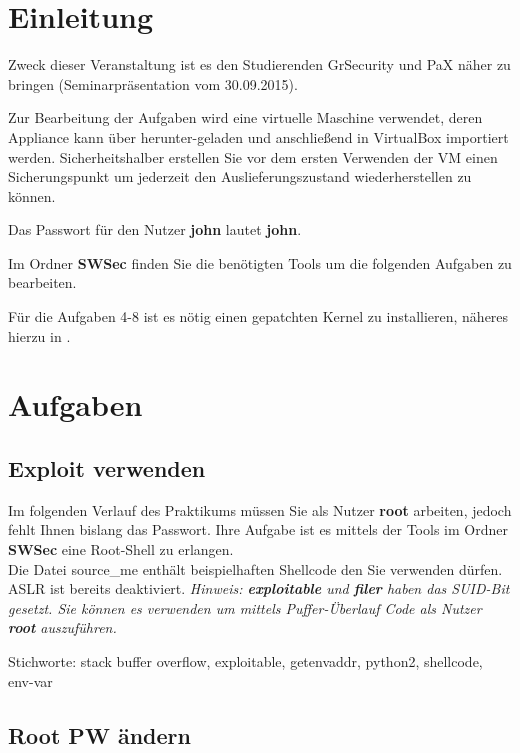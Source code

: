 \section{Einleitung}
\label{sec:Einleitung}
Zweck dieser Veranstaltung ist es den Studierenden GrSecurity und PaX näher zu bringen (Seminarpräsentation vom 30.09.2015).

Zur Bearbeitung der Aufgaben wird eine virtuelle Maschine verwendet, deren Appliance kann über  herunter-geladen und anschließend in VirtualBox importiert werden. Sicherheitshalber erstellen Sie vor dem ersten Verwenden der VM einen Sicherungspunkt um jederzeit den Auslieferungszustand wiederherstellen zu können.

Das Passwort für den Nutzer \textbf{john} lautet \textbf{john}.

Im Ordner \textbf{SWSec} finden Sie die benötigten Tools um die folgenden Aufgaben zu bearbeiten.

Für die Aufgaben 4-8 ist es nötig einen gepatchten Kernel zu installieren, näheres hierzu in .

\section{Aufgaben}
\label{Aufgaben}

\subsection{Exploit verwenden}
\label{subsec:Exploit verwenden}

Im folgenden Verlauf des Praktikums müssen Sie als Nutzer \textbf{root} arbeiten, jedoch fehlt Ihnen bislang das Passwort. Ihre Aufgabe ist es mittels der Tools im Ordner \textbf{SWSec} eine Root-Shell zu erlangen.\\
Die Datei source\_me enthält beispielhaften Shellcode den Sie verwenden dürfen. ASLR ist bereits deaktiviert.
\textit{Hinweis: \textbf{exploitable} und \textbf{filer} haben das SUID-Bit gesetzt. Sie können es verwenden um mittels Puffer-Überlauf Code als Nutzer \textbf{root} auszuführen.}

Stichworte: stack buffer overflow, exploitable, getenvaddr, python2, shellcode, env-var

\subsection{Root PW ändern}
\label{subsec:Root PW aendern}

